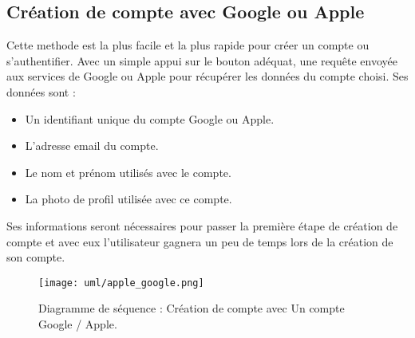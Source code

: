 \subsection{Création de compte avec Google ou Apple}
Cette methode est la plus facile et la plus rapide pour créer un compte ou s'authentifier. Avec un simple appui sur le bouton adéquat, une requête envoyée aux services de Google ou Apple pour récupérer les données du compte choisi. Ses données sont :
\begin{itemize}
    \item Un identifiant unique du compte Google ou Apple.
    \item L'adresse email du compte.
    \item Le nom et prénom utilisés avec le compte.
    \item La photo de profil utilisée avec ce compte.
\end{itemize}
Ses informations seront nécessaires pour passer la première étape de création de compte et avec eux l'utilisateur gagnera un peu de temps lors de la création de son compte.
\vspace{.5cm}
\begin{figure}[H]
    \centering
    \texttt{[image: uml/apple\_google.png]}
    \vspace{.5cm}
    \caption{Diagramme de séquence : Création de compte avec Un compte Google / Apple.}
    \label{fig:seq_register_apple_google}
\end{figure}
